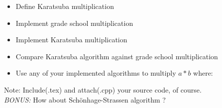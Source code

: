 \documentclass[12pt]{article}
\begin{document}
\begin{itemize}
    \item Define Karatsuba multiplication
    \item Implement grade school multiplication
    \item Implement Karatsuba multiplication
    \item Compare Karatsuba algorithm against grade school multiplication
    \item Use any of your implemented algorithms to multiply $a*b$ where:
\end{itemize}

Note: Include(.tex) and attach(.cpp) your source code, of course.\\

\emph{BONUS:} How about Sch\"{o}nhage-Strassen algorithm ? 
\end{document}
